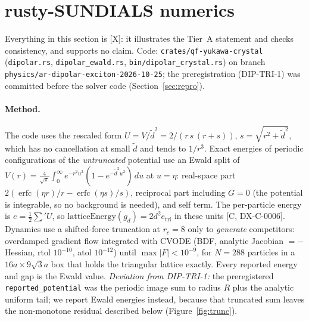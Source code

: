 \documentclass[11pt]{article}
\theoremstyle{remark}
\newcommand{\tier}[1]{\textsf{[#1]}}
\newcommand{\dt}{\tilde d}
\begin{document}
\section{rusty-SUNDIALS numerics}\label{sec:num}
Everything in this section is \tier{X}: it illustrates the Tier~A statement and checks consistency, and supports no
claim. Code: \texttt{crates/qf-yukawa-crystal} (\texttt{dipolar.rs}, \texttt{dipolar\_ewald.rs},
\texttt{bin/dipolar\_crystal.rs}) on branch \texttt{physics/ar-dipolar-exciton-2026-10-25}; the preregistration
(DIP-TRI-1) was committed before the solver code (Section~\ref{sec:repro}).

\paragraph{Method.} The code uses the rescaled form $U=V/\dt^2=2/(r\,s\,(r+s))$, $s=\sqrt{r^2+\dt^2}$, which has no
cancellation at small $\dt$ and tends to $1/r^3$. Exact energies of periodic configurations of the \emph{untruncated}
potential use an Ewald split of $V(r)=\frac{4}{\sqrt\pi}\int_0^\infty e^{-r^2u^2}(1-e^{-\dt^2u^2})\,du$ at $u=\eta$:
real-space part $2(\operatorname{erfc}(\eta r)/r-\operatorname{erfc}(\eta s)/s)$, reciprocal part including $G=0$ (the
potential is integrable, so no background is needed), and self term. The per-particle energy is
$e=\tfrac12\sum'U$, so $\mathrm{latticeEnergy}(g_d)=2d^2e_\mathrm{tri}$ in these units \tier{C, DX-C-0006}. Dynamics
use a shifted-force truncation at $r_c=8$ only to \emph{generate} competitors: overdamped gradient flow integrated with
CVODE (BDF, analytic Jacobian $=-$Hessian, rtol $10^{-10}$, atol $10^{-12}$) until $\max|F|<10^{-9}$, for
$N=288$ particles in a $16a\times9\sqrt3a$ box that holds the triangular lattice exactly. Every reported energy and
gap is the Ewald value. \emph{Deviation from DIP-TRI-1:} the preregistered \texttt{reported\_potential} was the periodic
image sum to radius $R$ plus the analytic uniform tail; we report Ewald energies instead, because that truncated sum
leaves the non-monotone residual described below (Figure~\ref{fig:trunc}).
\end{document}
